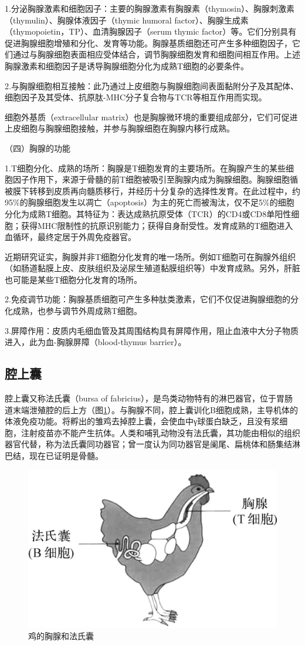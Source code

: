 1.分泌胸腺激素和细胞因子：主要的胸腺激素有胸腺素（thymosin）、胸腺刺激素（thymulin）、胸腺体液因子（thymic
humoral factor）、胸腺生成素（thymopoietin，TP）、血清胸腺因子（serum
thymic
factor）等。它们分别具有促进胸腺细胞增殖和分化、发育等功能。胸腺基质细胞还可产生多种细胞因子，它们通过与胸腺细胞表面相应受体结合，调节胸腺细胞发育和细胞间相互作用。上述胸腺激素和细胞因子是诱导胸腺细胞分化为成熟T细胞的必要条件。

2.与胸腺细胞相互接触：此乃通过上皮细胞与胸腺细胞间表面黏附分子及其配体、细胞因子及其受体、抗原肽-MHC分子复合物与TCR等相互作用而实现。

细胞外基质（extracellular
matrix）也是胸腺微环境的重要组成部分，它们可促进上皮细胞与胸腺细胞接触，并参与胸腺细胞在胸腺内移行成熟。

（四）胸腺的功能

1.T细胞分化、成熟的场所：胸腺是T细胞发育的主要场所。在胸腺产生的某些细胞因子作用下，来源于骨髓的前T细胞被吸引至胸腺内成为胸腺细胞。胸腺细胞循被膜下转移到皮质再向髓质移行，并经历十分复杂的选择性发育。在此过程中，约95\%的胸腺细胞发生以凋亡（apoptosis）为主的死亡而被淘汰，仅不足5\%的细胞分化为成熟T细胞。其特征为：表达成熟抗原受体（TCR）的CD4或CD8单阳性细胞；获得MHC限制性的抗原识别能力；获得自身耐受性。发育成熟的T细胞进入血循环，最终定居于外周免疫器官。

近期研究证实，胸腺并非T细胞分化发育的唯一场所。例如T细胞可在胸腺外组织（如肠道黏膜上皮、皮肤组织及泌尿生殖道黏膜组织等）中发育成熟。另外，肝脏也可能是某些T细胞分化发育的场所。

2.免疫调节功能：胸腺基质细胞可产生多种肽类激素，它们不仅促进胸腺细胞的分化成熟，也参与调节外周成熟T细胞。

3.屏障作用：皮质内毛细血管及其周围结构具有屏障作用，阻止血液中大分子物质进入，此为血-胸腺屏障（blood-thymus
barrier）。


\subsection{腔上囊}

腔上囊又称法氏囊（bursa of
fabricius），是鸟类动物特有的淋巴器官，位于胃肠道末端泄殖腔的后上方（图\ref{fig2-7}）。与胸腺不同，腔上囊训化B细胞成熟，主导机体的体液免疫功能。将孵出的雏鸡去掉腔上囊，会使血中γ球蛋白缺乏，且没有浆细胞，注射疫苗亦不能产生抗体。人类和哺乳动物没有法氏囊，其功能由相似的组织器官代替，称为法氏囊同功器官；曾一度认为同功器官是阑尾、扁桃体和肠集结淋巴结，现在已证明是骨髓。

\begin{figure}[!htbp]
 \centering
 \includegraphics[width=.5\textwidth]{./images/Image00032.jpg}
 \caption{鸡的胸腺和法氏囊}
 \label{fig2-7}
  \end{figure} 

